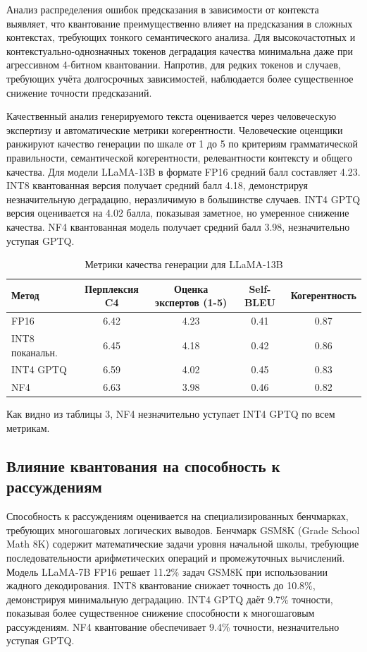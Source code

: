 \documentclass[bachelor, och, coursework]{SCWorks}
\begin{document}
	Анализ распределения ошибок предсказания в зависимости от контекста выявляет, что квантование преимущественно влияет на предсказания в сложных контекстах, требующих тонкого семантического анализа. Для высокочастотных и контекстуально-однозначных токенов деградация качества минимальна даже при агрессивном 4-битном квантовании. Напротив, для редких токенов и случаев, требующих учёта долгосрочных зависимостей, наблюдается более существенное снижение точности предсказаний.
	
	Качественный анализ генерируемого текста оценивается через человеческую экспертизу и автоматические метрики когерентности. Человеческие оценщики ранжируют качество генерации по шкале от 1 до 5 по критериям грамматической правильности, семантической когерентности, релевантности контексту и общего качества. Для модели LLaMA-13B в формате FP16 средний балл составляет 4.23. INT8 квантованная версия получает средний балл 4.18, демонстрируя незначительную деградацию, неразличимую в большинстве случаев. INT4 GPTQ версия оценивается на 4.02 балла, показывая заметное, но умеренное снижение качества. NF4 квантованная модель получает средний балл 3.98, незначительно уступая GPTQ.
	
	\begin{table}[!ht]
		\centering
		\small
		\caption{Метрики качества генерации для LLaMA-13B}
		\label{tab:quality}
		\begin{tabular}{|l|c|c|c|c|}
			\hline
			Метод & Перплексия C4 & Оценка экспертов (1-5) & Self-BLEU & Когерентность \\
			\hline
			FP16 & 6.42 & 4.23 & 0.41 & 0.87 \\
			\hline
			INT8 поканальн. & 6.45 & 4.18 & 0.42 & 0.86 \\
			\hline
			INT4 GPTQ & 6.59 & 4.02 & 0.45 & 0.83 \\
			\hline
			NF4 & 6.63 & 3.98 & 0.46 & 0.82 \\
			\hline
		\end{tabular}
	\end{table}
	
	Как видно из таблицы 3, NF4 незначительно уступает INT4 GPTQ по всем метрикам.
	
	\subsection{Влияние квантования на способность к рассуждениям}
	
	Способность к рассуждениям оценивается на специализированных бенчмарках, требующих многошаговых логических выводов. Бенчмарк GSM8K (Grade School Math 8K) содержит математические задачи уровня начальной школы, требующие последовательности арифметических операций и промежуточных вычислений. Модель LLaMA-7B FP16 решает 11.2\% задач GSM8K при использовании жадного декодирования. INT8 квантование снижает точность до 10.8\%, демонстрируя минимальную деградацию. INT4 GPTQ даёт 9.7\% точности, показывая более существенное снижение способности к многошаговым рассуждениям. NF4 квантование обеспечивает 9.4\% точности, незначительно уступая GPTQ.
	
\end{document}
